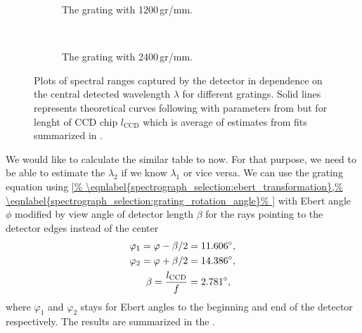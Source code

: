 \begin{figure}
	\centering
	\begin{subfigure}[b]{1\textwidth}
		\centering
		
		\caption{The grating with 1200\,gr/mm.}
		\label{\figlabel{spectrograph_selection:dipsersion_range_1200}}
	\end{subfigure}
	\\
	\begin{subfigure}[b]{1\textwidth}
		\centering
		
		\caption{The grating with 2400\,gr/mm.}
		\label{\figlabel{spectrograph_selection:dipsersion_range_2400}}
	\end{subfigure}
	\caption{Plots of spectral ranges captured by the detector in dependence on
		the central detected wavelength $\lambda$ for different gratings. Solid
		lines represents theoretical curves following
		with parameters from
		but for lenght of CCD chip $l_\text{CCD}$ which is average of estimates
		from fits summarized in
		.}
	\label{\figlabel{spectrograph_selection:dispersion_range}}
\end{figure}

We would like to calculate the similar table to
now. For that purpose, we need to be able to estimate the $\lambda_2$ if we
know $\lambda_1$ or vice versa. We can use the grating equation
using
\cref{%
	\eqnlabel{spectrograph_selection:ebert_transformation},%
	\eqnlabel{spectrograph_selection:grating_rotation_angle}%
}
with Ebert angle $\phi$ modified by view angle of detector length
$\beta$ for the rays pointing to the detector edges instead of the center
\begin{align}
	\begin{split}
		\varphi_1 = \varphi - \beta / 2    &= 11.606^\circ, \\
		\varphi_2 = \varphi + \beta / 2    &= 14.386^\circ, \\
		\beta     = \frac{l_\text{CCD}}{f} &=  2.781^\circ,
	\end{split}
	\label{\eqnlabel{spectrograph_selection:modified_ebert_angles}}
\end{align}
where $\varphi_1$ and $\varphi_2$ stays for Ebert angles to the beginning and
end of the detector respectively. The results are summarized in the
.

